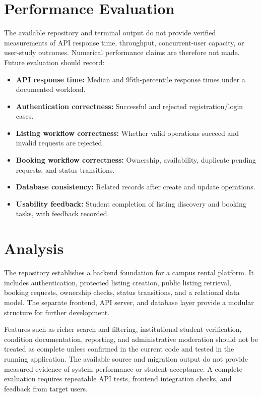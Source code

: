 \documentclass{tietreport}
\begin{document}
\section{Performance Evaluation}
The available repository and terminal output do not provide verified measurements of API response time, throughput, concurrent-user capacity, or user-study outcomes. Numerical performance claims are therefore not made. Future evaluation should record:
\begin{itemize}
  \item \textbf{API response time:} Median and 95th-percentile response times under a documented workload.
  \item \textbf{Authentication correctness:} Successful and rejected registration/login cases.
  \item \textbf{Listing workflow correctness:} Whether valid operations succeed and invalid requests are rejected.
  \item \textbf{Booking workflow correctness:} Ownership, availability, duplicate pending requests, and status transitions.
  \item \textbf{Database consistency:} Related records after create and update operations.
  \item \textbf{Usability feedback:} Student completion of listing discovery and booking tasks, with feedback recorded.
\end{itemize}

\section{Analysis}
The repository establishes a backend foundation for a campus rental platform. It includes authentication, protected listing creation, public listing retrieval, booking requests, ownership checks, status transitions, and a relational data model. The separate frontend, API server, and database layer provide a modular structure for further development.

Features such as richer search and filtering, institutional student verification, condition documentation, reporting, and administrative moderation should not be treated as complete unless confirmed in the current code and tested in the running application. The available source and migration output do not provide measured evidence of system performance or student acceptance. A complete evaluation requires repeatable API tests, frontend integration checks, and feedback from target users.
\end{document}
